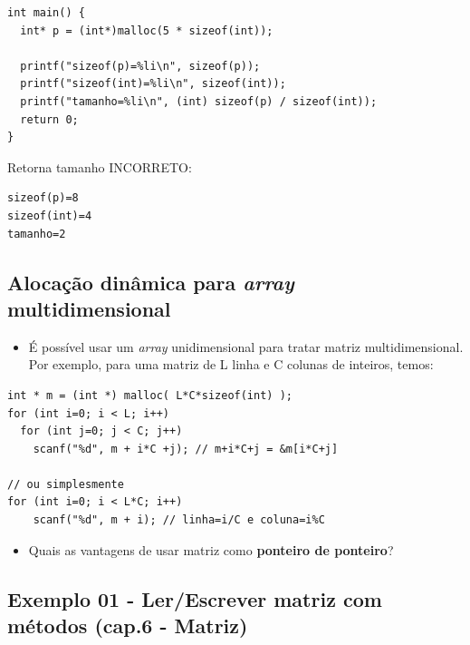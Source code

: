 \documentclass[12pt,a4paper]{article}
\providecommand{\tightlist}{%
      \setlength{\itemsep}{0pt}\setlength{\parskip}{0pt}}
\begin{document}
\begin{verbatim}
int main() {
  int* p = (int*)malloc(5 * sizeof(int));

  printf("sizeof(p)=%li\n", sizeof(p));
  printf("sizeof(int)=%li\n", sizeof(int));
  printf("tamanho=%li\n", (int) sizeof(p) / sizeof(int));
  return 0;
}
\end{verbatim}

Retorna tamanho INCORRETO:

\begin{verbatim}
sizeof(p)=8
sizeof(int)=4
tamanho=2
\end{verbatim}

    \hypertarget{alocauxe7uxe3o-dinuxe2mica-para-array-multidimensional}{%
\subsection{\texorpdfstring{Alocação dinâmica para \emph{array}
multidimensional}{Alocação dinâmica para array multidimensional}}\label{alocauxe7uxe3o-dinuxe2mica-para-array-multidimensional}}

    \begin{itemize}
\tightlist
\item
  É possível usar um \emph{array} unidimensional para tratar matriz
  multidimensional. Por exemplo, para uma matriz de L linha e C colunas
  de inteiros, temos:
\end{itemize}

\begin{verbatim}
int * m = (int *) malloc( L*C*sizeof(int) );
for (int i=0; i < L; i++)
  for (int j=0; j < C; j++)
    scanf("%d", m + i*C +j); // m+i*C+j = &m[i*C+j]

// ou simplesmente
for (int i=0; i < L*C; i++)
    scanf("%d", m + i); // linha=i/C e coluna=i%C
\end{verbatim}

    

    \begin{itemize}
\tightlist
\item
  Quais as vantagens de usar matriz como \textbf{ponteiro de ponteiro}?
\end{itemize}

    \hypertarget{exemplo-01---lerescrever-matriz-com-muxe9todos-cap.6---matriz}{%
\subsection{Exemplo 01 - Ler/Escrever matriz com métodos (cap.6 -
Matriz)}\label{exemplo-01---lerescrever-matriz-com-muxe9todos-cap.6---matriz}}
\end{document}
